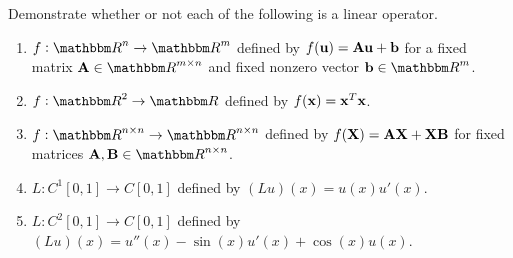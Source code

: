 
Demonstrate whether or not each of the following is a linear operator.
\\
\begin{enumerate}
\item $f:\R^n\to \R^m$ defined by $f({\bf u}) = {\bf A} {\bf u} + {\bf b}$ for a fixed matrix $\BA\in\Rmn$ and fixed nonzero vector $\Bb\in\Rm$.
\\
\item $f:\R^2 \to \R$ defined by $f({\bf x}) = {\bf x}^T {\bf x}$.
\\
\item $f:\Rnn\to \Rnn$ defined by $f({\bf X}) = {\bf A}{\bf X} + {\bf X}{\bf B}$ for fixed matrices $\BA, \BB\in\Rnn$.
\\
\item $L: C^1[0,1] \to C[0,1]$ defined by $\displaystyle{ (Lu)(x) = u(x)u'(x)}$.
\\
\item $L: C^2[0,1] \to C[0,1]$ defined by $\displaystyle{ (Lu)(x) = u''(x) - \sin(x)u'(x) + \cos(x) u(x)}$.
\end{enumerate}




